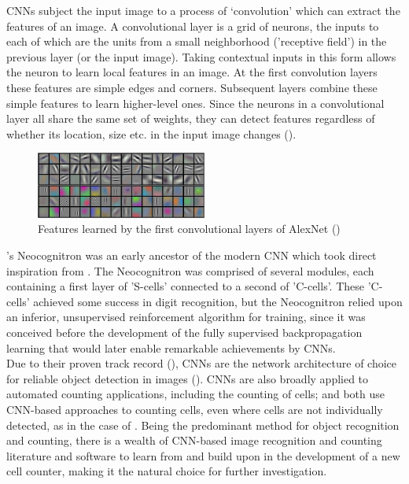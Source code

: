 CNNs subject the input image to a process of ‘convolution’ which can extract the features of an image. A convolutional layer is a grid of neurons, the inputs to each of which are the units from a small neighborhood ('receptive field') in the previous layer (or the input image). Taking contextual inputs in this form allows the neuron to learn local features in an image. At the first convolution layers these features are simple edges and corners. Subsequent layers combine these simple features to learn higher-level ones. Since the neurons in a convolutional layer all share the same set of weights, they can detect features regardless of whether its location, size etc. in the input image changes (\cite{LeCun-1989}).\\

\begin{figure}[h!]
	\centering
	\includegraphics[width=0.5\textwidth]{images/02Background/filters.jpg}
	\caption{Features learned by the first convolutional layers of AlexNet (\cite{Krizhevsky-2012})}
\end{figure}

\cite{FUKUSHIMA1982455}'s Neocognitron was an early ancestor of the modern CNN which took direct inspiration from \cite{hubel1962receptive}. The Neocognitron was comprised of several modules, each containing a first layer of 'S-cells' connected to a second of 'C-cells'. These 'C-cells' achieved some success in digit recognition, but the Neocognitron relied upon an inferior, unsupervised reinforcement algorithm for training, since it was conceived before the development of the fully supervised backpropagation learning that would later enable remarkable achievements by CNNs.\\

Due to their proven track record (\cite{Krizhevsky-2012,girshick2014rich,redmon2016look}), CNNs are the network architecture of choice for reliable object detection in images (\cite{LeCun-et-al-2015}). CNNs are also broadly applied to automated counting applications, including the counting of cells; \cite{xie2018microscopy} and \cite{Identification-and-enumeration-of-cyanobacteria} both use CNN-based approaches to counting cells, even where cells are not individually detected, as in the case of \cite{xie2018microscopy}. Being the predominant method for object recognition and counting, there is a wealth of CNN-based image recognition and counting literature and software to learn from and build upon in the development of a new cell counter, making it the natural choice for further investigation.

